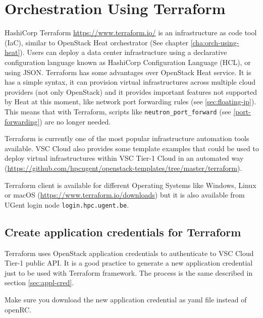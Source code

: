 \chapter{Orchestration Using Terraform}\label{cha:orch-using-terraform}

HashiCorp \gls{Terraform} \url{https://www.terraform.io/} is an infrastructure
as code tool (IaC), similar to OpenStack \gls{Heat} orchestrator
(See chapter \ref{cha:orch-using-heat}).
Users can deploy a data center infrastructure using a declarative
configuration language known as HashiCorp Configuration Language (HCL), or using JSON.
\gls{Terraform} has some advantages over OpenStack \gls{Heat} service.
It is has a simple syntax, it can provision virtual infrastructures across multiple cloud
providers (not only OpenStack) and it provides important features not supported
by \gls{Heat} at this moment, like network port forwarding rules (see \ref{sec:floating-ip}).
This means that with Terraform, scripts like \lstinline{neutron_port_forward}
(see \ref{port-forwarding}) are no longer needed.

\gls{Terraform} is currently one of the most popular infrastructure automation tools available.
VSC Cloud also provides some template examples that could be used to deploy virtual
infrastructures within VSC Tier-1 Cloud in an automated way
(\url{https://github.com/hpcugent/openstack-templates/tree/master/terraform}).

\gls{Terraform} client is available for different Operating Systems like Windows,
Linux or macOS (\url{https://www.terraform.io/downloads}) but it is also available from
UGent login node \lstinline{login.hpc.ugent.be}.

\section{Create application credentials for Terraform}\label{sec:app-cred-terraform}

\gls{Terraform} uses OpenStack application credentials to authenticate
to VSC Cloud Tier-1 public API. It is a good practice to generate a new application credential
just to be used with \gls{Terraform} framework. The process is the same described in section \ref{sec:appl-cred}.

 Make sure you download the new application credential as yaml file instead of openRC.

